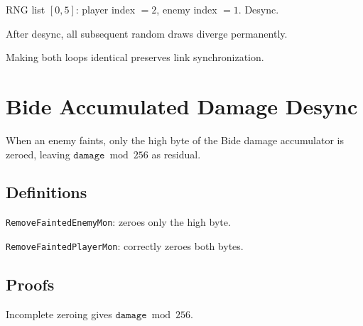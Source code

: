 \begin{theorem}\label{thm:desync_level50}
  \leanok
  RNG list $[0, 5]$: player index $= 2$, enemy index $= 1$. Desync.
\end{theorem}

\begin{theorem}\label{thm:desync_propagates}
  \leanok
  After desync, all subsequent random draws diverge permanently.
\end{theorem}

\begin{theorem}\label{thm:psywave_fix}
  \leanok
  Making both loops identical preserves link synchronization.
\end{theorem}

\chapter{Bide Accumulated Damage Desync}\label{ch:bide}

When an enemy faints, only the high byte of the Bide damage accumulator is zeroed,
leaving $\texttt{damage} \bmod 256$ as residual.

\section{Definitions}

\begin{definition}\label{def:clear_high}
  \leanok
  \texttt{RemoveFaintedEnemyMon}: zeroes only the high byte.
\end{definition}

\begin{definition}\label{def:clear_both}
  \leanok
  \texttt{RemoveFaintedPlayerMon}: correctly zeroes both bytes.
\end{definition}

\section{Proofs}

\begin{theorem}\label{thm:clear_high_mod256}
  \leanok
  Incomplete zeroing gives $\texttt{damage} \bmod 256$.
\end{theorem}

